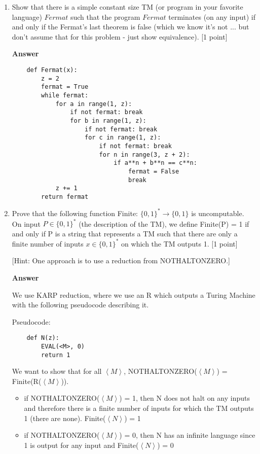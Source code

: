 \documentclass[11pt]{article}
\newcommand \kw[1]{\textbf{#1}}
\newenvironment{answer}{
\vspace{.5cm}
\begin{mdframed}[]
    \kw{Answer} 
}
{
\end{mdframed}
\pagebreak
}
\begin{document}
\begin{enumerate}
\begin{answer}
\begin{verbatim}
    \end{verbatim}
\end{answer}


\item Show that there is a simple constant size TM (or program in your favorite language) $Fermat$ such that the program $Fermat$ terminates (on any input) if and only if the Fermat's last theorem is false (which we know it's not ... but don't assume that for this problem - just show equivalence). [1 point]

\begin{answer}

    \begin{verbatim}
    def Fermat(x):
        z = 2
        fermat = True
        while fermat:
            for a in range(1, z):
                if not fermat: break
                for b in range(1, z):
                    if not fermat: break
                    for c in range(1, z):
                        if not fermat: break
                        for n in range(3, z + 2):
                            if a**n + b**n == c**n: 
                                fermat = False
                                break
            z += 1
        return fermat
    \end{verbatim}
\end{answer}

\item Prove that the following function Finite: $\{0,1\}^* \rightarrow \{0,1\}$ is uncomputable. On input $P \in \{0,1\}^*$ (the description of the TM), we define Finite(P) = 1 if and only if P is a string that represents a TM such that there are only a finite number of inputs $x \in \{0,1\}^*$ on which the TM outputs 1.
[1 point]

[Hint: One approach is to use a reduction from NOTHALTONZERO.]

\begin{answer}
   
    We use KARP reduction, where we use an R which outputs a Turing Machine with the following pseudocode describing it.

    Pseudocode:
    \begin{verbatim}
    def N(z):
        EVAL(<M>, 0)
        return 1
    \end{verbatim}

    We want to show that for all $\left<M\right>$, NOTHALTONZERO($\left<M\right>$) = Finite(R($\left<M\right>$)).
    \begin{itemize}
        \item if NOTHALTONZERO($\left<M\right>$) = 1, then N does not halt on any inputs and therefore there is a finite number of inputs for which the TM outputs 1 (there are none). Finite($\left<N\right>$) = 1
        \item if NOTHALTONZERO($\left<M\right>$) = 0, then N has an infinite language since 1 is output for any input and Finite($\left<N\right>$) = 0
    \end{itemize}


\end{answer}
\end{enumerate}
\end{document}
